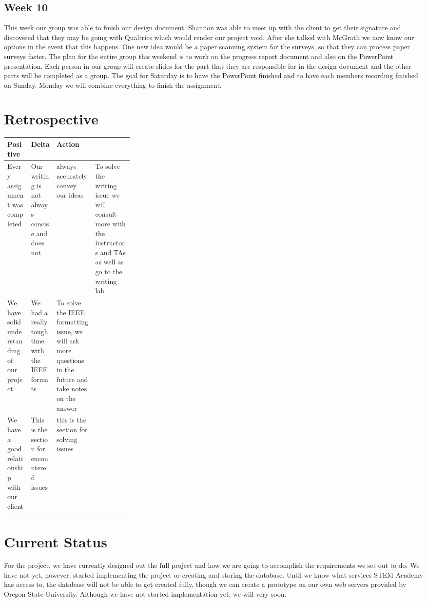 \documentclass[letterpaper,10pt,serif, draftclsnofoot,onecolumn, compsoc, titlepage]{IEEEtran}
\begin{document}
\subsection{Week 10}
This week our group was able to finish our design document. Shannon was able to meet up with the client to get their signature and discovered that they may be going with Qualtrics which would render our project void. After she talked with McGrath we now know our options in the event that this happens. One new idea would be a paper scanning system for the surveys, so that they can process paper surveys faster. The plan for the entire group this weekend is to work on the progress report document and also on the PowerPoint presentation. Each person in our group will create slides for the part that they are responsible for in the design document and the other parts will be completed as a group. The goal for Saturday is to have the PowerPoint finished and to have each members recording finished on Sunday. Monday we will combine everything to finish the assignment. 

\section{Retrospective}
\begin{center}
    \begin{tabular}{ | l | l | l | p{0.3\linewidth} |}
    \hline
     Positive & Delta & Action \\ \hline
  	Every assignment was completed & Our writing is not always concise and does not& always accurately convey our ideas & To solve the writing issue we will consult more with the instructors and TAs as well as go to the writing lab \\\hline
	
	We have solid understanding of our project & We had a really tough time with the IEEE formats & To solve the IEEE formatting issue, we will ask more questions in the future and take notes on the answer \\ \hline
	We have a good relationship with our client & This is the section for encountered issues & this is the section for solving issues \\ \hline
    \end{tabular}
\end{center}

\section{Current Status}
For the project, we have currently designed out the full project and how we are going to accomplish the requirements we set out to do.
We have not yet, however, started implementing the project or creating and storing the database.
Until we know what services STEM Academy has access to, the database will not be able to get created fully, though we can create a prototype on our own web servers provided by Oregon State University.
Although we have not started implementation yet, we will very soon.
\end{document}
